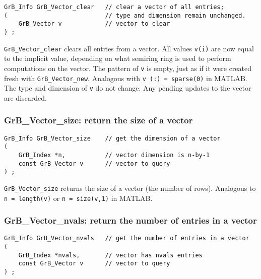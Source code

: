 \documentclass[12pt]{article}
\begin{document}
\begin{mdframed}[userdefinedwidth=6in]
{\footnotesize
\begin{verbatim}
GrB_Info GrB_Vector_clear   // clear a vector of all entries;
(                           // type and dimension remain unchanged.
    GrB_Vector v            // vector to clear
) ;
\end{verbatim}
} \end{mdframed}

\verb'GrB_Vector_clear' clears all entries from a vector.  All values
\verb'v(i)' are now equal to the implicit value, depending on what semiring
ring is used to perform computations on the vector.  The pattern of \verb'v' is
empty, just as if it were created fresh with \verb'GrB_Vector_new'.  Analogous
with \verb'v (:) = sparse(0)' in MATLAB.  The type and dimension of \verb'v' do
not change.  Any pending updates to the vector are discarded.

\newpage
\subsubsection{{\sf GrB\_Vector\_size:}          return the size of a vector}
\label{vector_size}

\begin{mdframed}[userdefinedwidth=6in]
{\footnotesize
\begin{verbatim}
GrB_Info GrB_Vector_size    // get the dimension of a vector
(
    GrB_Index *n,           // vector dimension is n-by-1
    const GrB_Vector v      // vector to query
) ;
\end{verbatim}
} \end{mdframed}

\verb'GrB_Vector_size' returns the size of a vector (the number of rows).
Analogous to \verb'n = length(v)' or \verb'n = size(v,1)' in MATLAB.

\subsubsection{{\sf GrB\_Vector\_nvals:}         return the number of entries in a vector}
\label{vector_nvals}

\begin{mdframed}[userdefinedwidth=6in]
{\footnotesize
\begin{verbatim}
GrB_Info GrB_Vector_nvals   // get the number of entries in a vector
(
    GrB_Index *nvals,       // vector has nvals entries
    const GrB_Vector v      // vector to query
) ;
\end{verbatim}
} \end{mdframed}
\end{document}

